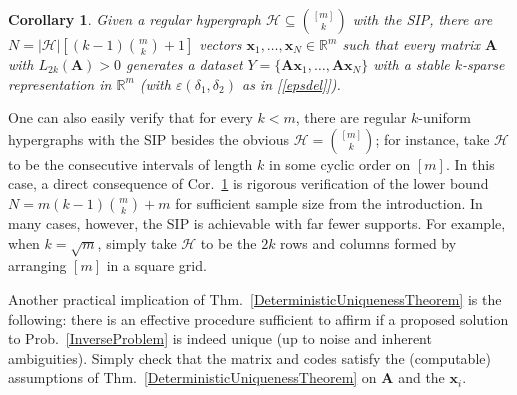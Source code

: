 \documentclass[9pt,twocolumn]{pnas-new}
\newtheorem{corollary}{Corollary}
\renewcommand{\eqref}[1]{\textnormal{[\ref{#1}]}}
\begin{document}
\begin{corollary}\label{DeterministicUniquenessCorollary}
Given a regular hypergraph $\mathcal{H} \subseteq {[m] \choose k}$ with the SIP, there are $N =  |\mathcal{H}| \left[ (k-1){m \choose k} + 1  \right]$ vectors \mbox{$\mathbf{x}_1, \ldots, \mathbf{x}_N \in \mathbb{R}^m$} such that every matrix $\mathbf{A}$ with $L_{2k}(\mathbf{A}) > 0$ generates a dataset $Y = \{\mathbf{A}\mathbf{x}_1, \ldots, \mathbf{A}\mathbf{x}_N\}$ with a stable $k$-sparse representation in $\mathbb{R}^m$ (with $\varepsilon(\delta_1,\delta_2)$ as in \eqref{epsdel}).
\end{corollary}

One can also easily verify that for every $k < m$, there are regular $k$-uniform hypergraphs with the SIP besides the obvious $\mathcal{H} = {[m] \choose k}$; for instance, take $\mathcal{H}$ to be the consecutive intervals of length $k$ in some cyclic order on $[m]$. In this case, a direct consequence of Cor.~\ref{DeterministicUniquenessCorollary} is rigorous verification of the lower bound \mbox{$N = m(k-1){m \choose k} + m$} for sufficient sample size from the introduction. In many cases, however, the SIP is achievable with far fewer supports. For example, when $k = \sqrt{m}$, simply take $\mathcal{H}$ to be the $2k$ rows and columns formed by arranging $[m]$ in a square grid.

Another practical implication of Thm.~\ref{DeterministicUniquenessTheorem} is the following: there is an effective procedure sufficient to affirm if a proposed solution to Prob.~\ref{InverseProblem} is indeed unique (up to noise and inherent ambiguities). Simply check that the matrix and codes satisfy the (computable) assumptions of Thm.~\ref{DeterministicUniquenessTheorem} on $\mathbf{A}$ and the $\mathbf{x}_i$.  
\end{document}
